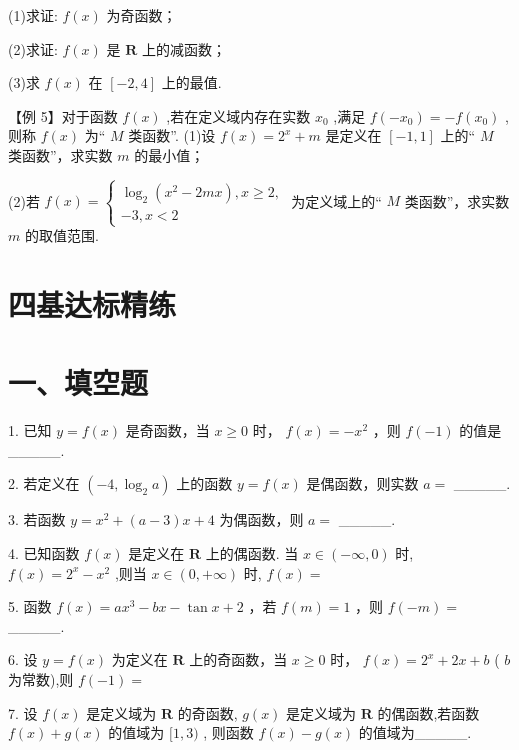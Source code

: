 (1)求证: $f\left( x\right)$ 为奇函数；

(2)求证: $f\left( x\right)$ 是 $\mathbf{R}$ 上的减函数；

(3)求 $f\left( x\right)$ 在 $\left\lbrack  {-2,4}\right\rbrack$ 上的最值.

【例 5】对于函数 $f\left( x\right)$ ,若在定义域内存在实数 ${x}_{0}$ ,满足 $f\left( {-{x}_{0}}\right)  =  - f\left( {x}_{0}\right)$ ,则称 $f\left( x\right)$ 为“ $M$ 类函数”. (1)设 $f\left( x\right)  = {2}^{x} + m$ 是定义在 $\left\lbrack  {-1,1}\right\rbrack$ 上的“ $M$ 类函数”，求实数 $m$ 的最小值；

(2)若 $f\left( x\right)  = \left\{  \begin{array}{l} {\log }_{2}\left( {{x}^{2} - {2mx}}\right) ,x \geq  2, \\   - 3,x < 2 \end{array}\right.$ 为定义域上的“ $M$ 类函数”，求实数 $m$ 的取值范围.

\section*{四基达标精练}

\section*{一、填空题}

1. 已知 $y = f\left( x\right)$ 是奇函数，当 $x \geq  0$ 时， $f\left( x\right)  =  - {x}^{2}$ ，则 $f\left( {-1}\right)$ 的值是\_\_\_\_\_.

2. 若定义在 $\left( {-4,{\log }_{2}a}\right)$ 上的函数 $y = f\left( x\right)$ 是偶函数，则实数 $a =$ \_\_\_\_\_.

3. 若函数 $y = {x}^{2} + \left( {a - 3}\right) x + 4$ 为偶函数，则 $a =$ \_\_\_\_\_.

4. 已知函数 $f\left( x\right)$ 是定义在 $\mathbf{R}$ 上的偶函数. 当 $x \in  \left( {-\infty ,0}\right)$ 时, $f\left( x\right)  = {2}^{x} - {x}^{2}$ ,则当 $x \in  \left( {0, + \infty }\right)$ 时, $f\left( x\right)  =$

5. 函数 $f\left( x\right)  = a{x}^{3} - {bx} - \tan x + 2$ ，若 $f\left( m\right)  = 1$ ，则 $f\left( {-m}\right)  =$ \_\_\_\_\_.

6. 设 $y = f\left( x\right)$ 为定义在 $\mathbf{R}$ 上的奇函数，当 $x \geq  0$ 时， $f\left( x\right)  = {2}^{x} + {2x} + b$ ( $b$ 为常数),则 $f\left( {-1}\right)  =$

7. 设 $f\left( x\right)$ 是定义域为 $\mathbf{R}$ 的奇函数, $g\left( x\right)$ 是定义域为 $\mathbf{R}$ 的偶函数,若函数 $f\left( x\right)  + g\left( x\right)$ 的值域为 $\lbrack 1,3)$ , 则函数 $f\left( x\right)  - g\left( x\right)$ 的值域为\_\_\_\_\_.

